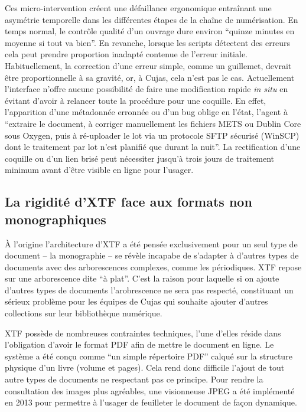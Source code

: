 Ces micro-intervention créent une défaillance ergonomique entraînant une asymétrie temporelle dans les différentes étapes de la chaîne de numérisation. En temps normal, le contrôle qualité d'un ouvrage dure environ \enquote{quinze minutes en moyenne si tout va bien}. En revanche, lorsque les scripts détectent des erreurs cela peut prendre proportion inadapté contenue de l'erreur initiale. Habituellement, la correction d'une erreur simple, comme un guillemet, devrait être proportionnelle à sa gravité, or, à Cujas, cela n'est pas le cas. Actuellement l'interface n'offre aucune possibilité de faire une modification rapide \textit{in situ} en évitant d'avoir à relancer toute la procédure pour une coquille. En effet, l'apparition d'une métadonnée erronnée ou d'un bug oblige en l'état, l'agent à \enquote{extraire le document, à corriger manuellement les fichiers METS ou Dublin Core sous Oxygen, puis à ré-uploader le lot via un protocole SFTP sécurisé (WinSCP) dont le traitement par lot n'est planifié que durant la nuit}. La rectification d'une coquille ou d'un lien brisé peut nécessiter jusqu'à trois jours de traitement minimum avant d'être visible en ligne pour l'usager.  

\subsection{La rigidité d'XTF face aux formats non monographiques}
À l'origine l'architecture d'XTF a été pensée exclusivement pour un seul type de document -- la monographie -- se révèle incapabe de s'adapter à d'autres types de documents avec des arborescences complexes, comme les périodiques. XTF repose sur une arborescence dite \enquote{à plat}. C'est la raison pour laquelle si on ajoute d'autres types de documents l'arobrescence ne sera pas respecté, constituant un sérieux problème pour les équipes de Cujas qui souhaite ajouter d'autres collections sur leur bibliothèque numérique. 

XTF possède de nombreuses contraintes techniques, l'une d'elles réside dans l'obligation d'avoir le format PDF afin de mettre le document en ligne. Le système a été conçu comme \enquote{un simple répertoire PDF} calqué sur la structure physique d'un livre (volume et pages). Cela rend donc difficile l'ajout de tout autre types de documents ne respectant pas ce principe. Pour rendre la consultation des images plus agréables, une visionneuse JPEG a été implémenté en 2013 pour permettre à l'usager de feuilleter le document de façon dynamique. 


